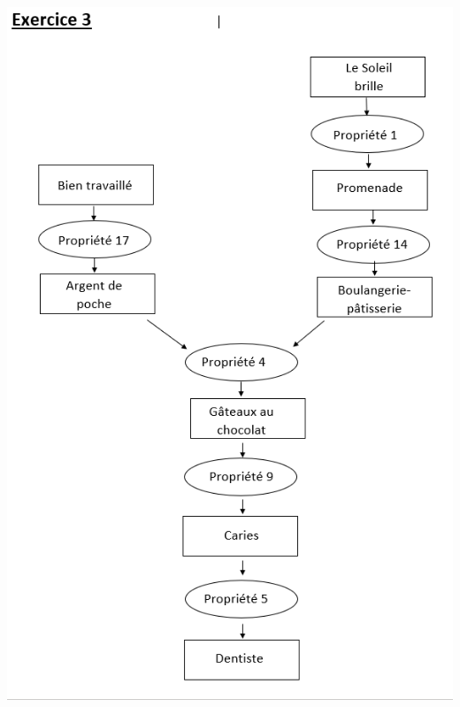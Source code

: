\documentclass[12pt,a4paper]{article}
\begin{document}
\begin{center}
	\includegraphics[scale=1]{demo_3}
	
\end{center}
\end{document}
